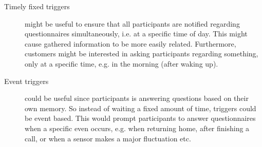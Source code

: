 \begin{description}
    \item[Timely fixed triggers] might be useful to ensure that all participants are notified regarding questionnaires simultaneously, i.e. at a specific time of day. This might cause gathered information to be more easily related. Furthermore, customers might be interested in asking participants regarding something, only at a specific time, e.g. in the morning (after waking up). 

    \item[Event triggers] could be useful since participants is answering questions based on their own memory. So instead of waiting a fixed amount of time, triggers could be event based. This would prompt participants to answer questionnaires when a specific even occurs, e.g. when returning home, after finishing a call, or when a sensor makes a major fluctuation etc.    
\end{description}    

